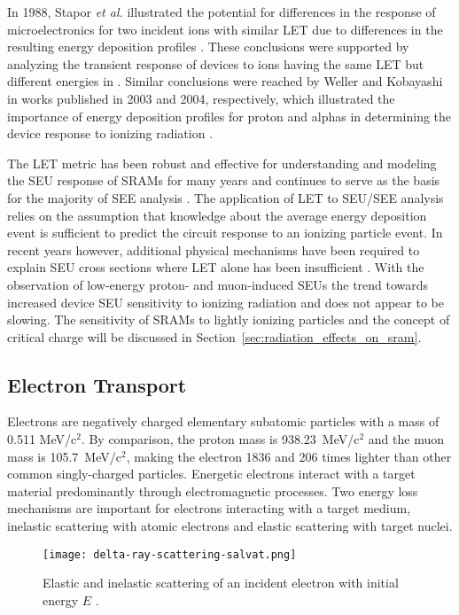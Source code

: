 In 1988, Stapor \emph{et al.} illustrated the potential for differences in the response of microelectronics for two incident ions with similar LET due to differences in the resulting energy deposition profiles \cite{Stapor:1988ws}. 
These conclusions were supported by analyzing the transient response of devices to ions having the same LET but different energies in \cite{HowardJr:2002vg}.
Similar conclusions were reached by Weller and Kobayashi in works published in 2003 and 2004, respectively, which illustrated the importance of energy deposition profiles for proton and alphas in determining the device response to ionizing radiation \cite{Weller:2003je, Kobayashi:2004dg}.

The LET metric has been robust and effective for understanding and modeling the SEU response of SRAMs for many years and continues to serve as the basis for the majority of SEE analysis \cite{Dodd:1998tn,Dodd:1998ua,Dodd:2001tx}.
The application of LET to SEU/SEE analysis relies on the assumption that knowledge about the average energy deposition event is sufficient to predict the circuit response to an ionizing particle event. 
In recent years however, additional physical mechanisms have been required to explain SEU cross sections where LET alone has been insufficient \cite{Reed:2002wn,Kobayashi:2005jt,Reed:2006cx,Reed:2007vz,Warren:2007ca}. 
With the observation of low-energy proton- and muon-induced SEUs the trend towards increased device SEU sensitivity to ionizing radiation and does not appear to be slowing.
The sensitivity of SRAMs to lightly ionizing particles and the concept of critical charge will be discussed in Section~\ref{sec:radiation_effects_on_sram}.

\subsection{Electron Transport} %
\label{sub:electron_transport}
Electrons are negatively charged elementary subatomic particles with a mass of 0.511 MeV/c$^2$.
By comparison, the proton mass is 938.23~MeV/c$^2$ and the muon mass is 105.7~MeV/c$^2$, making the electron 1836 and 206 times lighter than other common singly-charged particles.
Energetic electrons interact with a target material predominantly through electromagnetic processes. 
Two energy loss mechanisms are important for electrons interacting with a target medium, inelastic scattering with atomic electrons and elastic scattering with target nuclei.
\begin{figure}[tb]
    \begin{center}
        \texttt{[image: delta-ray-scattering-salvat.png]}
    \end{center}
    \caption[Elastic and inelastic scattering of an incident electron with initial energy $E$.]{Elastic and inelastic scattering of an incident electron with initial energy $E$ \cite{Salvat:ue}.}
    \label{fig:electron-scattering-elastic-inelastic}
\end{figure}

